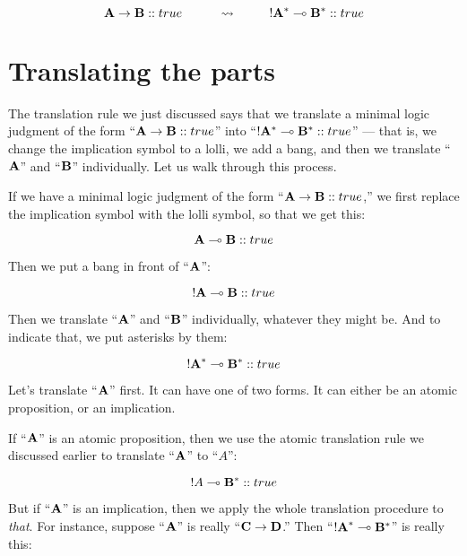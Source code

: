 \documentclass[../../../main.tex]{subfiles}
\begin{document}
\begin{equation*}
  \nd{A \impl/ B} :: true \hskip 1cm \rightsquigarrow \hskip 1cm \bang/\nd{A}^{*} \lolli/ \nd{B}^{*} :: true
\end{equation*}


\section{Translating the parts}

The translation rule we just discussed says that we translate a minimal logic judgment of the form ``$\nd{A \impl/ B} :: true$'' into ``$\bang/\nd{A}^{*} \lolli/ \nd{B}^{*} :: true$'' --- that is, we change the implication symbol to a lolli, we add a bang, and then we translate ``$\mathbf{A}$'' and ``$\mathbf{B}$'' individually. Let us walk through this process. 

If we have a minimal logic judgment of the form ``$\nd{A \impl/ B} :: true$,'' we first replace the implication symbol with the lolli symbol, so that we get this:

\begin{equation*}
  \nd{A \lolli/ B} :: true
\end{equation*}

\noindent
Then we put a bang in front of ``$\mathbf{A}$'':

\begin{equation*}
  \nd{\bang/A \lolli/ B} :: true
\end{equation*}

\noindent
Then we translate ``$\mathbf{A}$'' and ``$\mathbf{B}$'' individually, whatever they might be. And to indicate that, we put asterisks by them:

\begin{equation*}
  \nd{\bang/A}^{*} \lolli/ \nd{B}^{*} :: true
\end{equation*}

\noindent
Let's translate ``$\mathbf{A}$'' first. It can have one of two forms. It can either be an atomic proposition, or an implication. 

If ``$\mathbf{A}$'' is an atomic proposition, then we use the atomic translation rule we discussed earlier to translate ``$\mathbf{A}$'' to ``$A$'':

\begin{equation*}
  \bang/A \lolli/ \nd{B}^{*} :: true
\end{equation*}

\noindent
But if ``$\mathbf{A}$'' is an implication, then we apply the whole translation procedure to \emph{that}. For instance, suppose ``$\mathbf{A}$'' is really ``$\nd{C \impl/ D}$.'' Then ``$\nd{\bang/A}^{*} \lolli/ \nd{B}^{*}$'' is really this:
\end{document}
